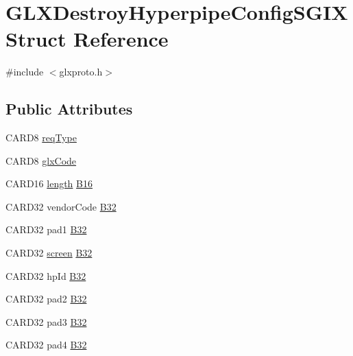 \hypertarget{struct_g_l_x_destroy_hyperpipe_config_s_g_i_x}{}\section{G\+L\+X\+Destroy\+Hyperpipe\+Config\+S\+G\+IX Struct Reference}
\label{struct_g_l_x_destroy_hyperpipe_config_s_g_i_x}


{\ttfamily \#include $<$glxproto.\+h$>$}

\subsection*{Public Attributes}
\begin{DoxyCompactItemize}
\item 
C\+A\+R\+D8 \hyperlink{struct_g_l_x_destroy_hyperpipe_config_s_g_i_x_ad3983297984f6008cb812c36709d41b2}{req\+Type}
\item 
C\+A\+R\+D8 \hyperlink{struct_g_l_x_destroy_hyperpipe_config_s_g_i_x_a79bbc19735a7a8484c8765d819ad0676}{glx\+Code}
\item 
C\+A\+R\+D16 \hyperlink{glcorearb_8h_ab9c919755bde3b34349e23a32b4e0fa7}{length} \hyperlink{struct_g_l_x_destroy_hyperpipe_config_s_g_i_x_a6dd618f9a483906ef7ca0d1fdf468d03}{B16}
\item 
C\+A\+R\+D32 vendor\+Code \hyperlink{struct_g_l_x_destroy_hyperpipe_config_s_g_i_x_a3bb69585d5ef33ad896d296ac9d49c43}{B32}
\item 
C\+A\+R\+D32 pad1 \hyperlink{struct_g_l_x_destroy_hyperpipe_config_s_g_i_x_a5db25d9a5f03bf63c572de2ca30f6bb1}{B32}
\item 
C\+A\+R\+D32 \hyperlink{cad_8h_ae04e09e4e3831bfc1632c509ae37dcec}{screen} \hyperlink{struct_g_l_x_destroy_hyperpipe_config_s_g_i_x_a3ba03207ce9858726c7ff7819366ddd2}{B32}
\item 
C\+A\+R\+D32 hp\+Id \hyperlink{struct_g_l_x_destroy_hyperpipe_config_s_g_i_x_a1920b4d22cd5d8f56c44125f12c950e2}{B32}
\item 
C\+A\+R\+D32 pad2 \hyperlink{struct_g_l_x_destroy_hyperpipe_config_s_g_i_x_aea554d447ca010b0ef5b2b1b4aeba4ef}{B32}
\item 
C\+A\+R\+D32 pad3 \hyperlink{struct_g_l_x_destroy_hyperpipe_config_s_g_i_x_afe79f6b881e9cdd9a1e2ca9f57ca8037}{B32}
\item 
C\+A\+R\+D32 pad4 \hyperlink{struct_g_l_x_destroy_hyperpipe_config_s_g_i_x_a878262ffd9a8c52676872f92764b14df}{B32}
\end{DoxyCompactItemize}


